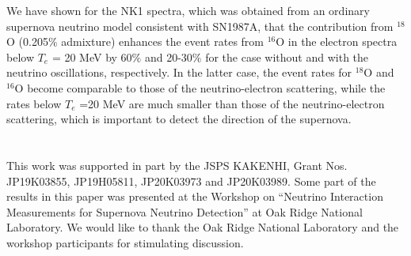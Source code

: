 \documentclass[preprint,12pt]{elsarticle}
\begin{document}
We have shown for the NK1 spectra, which was obtained from an ordinary supernova neutrino model consistent with SN1987A, 
that the contribution from $^{18}$O (0.205$\%$ admixture) enhances the event rates from $^{16}$O in the electron spectra below $T_e$ = 20 MeV by 60$\%$ and 20-30$\%$ for the case without and with the neutrino oscillations, respectively.
In the latter case, the event rates for $^{18}$O and $^{16}$O become comparable to those of the neutrino-electron scattering,
while the rates below $T_e$ =20 MeV are much smaller than those of the neutrino-electron scattering, which is important to detect the direction of the supernova.
\\
\\ 

\\
This work was supported in part by the JSPS KAKENHI, Grant Nos. JP19K03855, JP19H05811, JP20K03973 and JP20K03989.
Some part of the results in this paper was presented at the Workshop on “Neutrino Interaction Measurements for Supernova Neutrino Detection” at Oak Ridge National Laboratory.
We would like to thank the Oak Ridge National Laboratory and the workshop
participants for stimulating discussion.
 




\end{document}
